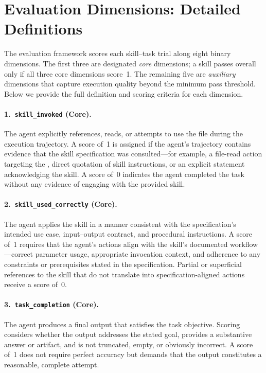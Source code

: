 
\section{Evaluation Dimensions: Detailed Definitions}
\label{app:eval_dimensions}

The \medskillbench evaluation framework scores each skill--task trial along eight binary dimensions.
The first three are designated \emph{core} dimensions; a skill passes overall only if all three core dimensions score~1.
The remaining five are \emph{auxiliary} dimensions that capture execution quality beyond the minimum pass threshold.
Below we provide the full definition and scoring criteria for each dimension.

\paragraph{1.\ \texttt{skill\_invoked} (Core).}
The agent explicitly references, reads, or attempts to use the \skillmd file during the execution trajectory.
A score of~1 is assigned if the agent's trajectory contains evidence that the skill specification was consulted---for example, a file-read action targeting the \skillmd, direct quotation of skill instructions, or an explicit statement acknowledging the skill.
A score of~0 indicates the agent completed the task without any evidence of engaging with the provided skill.

\paragraph{2.\ \texttt{skill\_used\_correctly} (Core).}
The agent applies the skill in a manner consistent with the specification's intended use case, input--output contract, and procedural instructions.
A score of~1 requires that the agent's actions align with the skill's documented workflow---correct parameter usage, appropriate invocation context, and adherence to any constraints or prerequisites stated in the specification.
Partial or superficial references to the skill that do not translate into specification-aligned actions receive a score of~0.

\paragraph{3.\ \texttt{task\_completion} (Core).}
The agent produces a final output that satisfies the task objective.
Scoring considers whether the output addresses the stated goal, provides a substantive answer or artifact, and is not truncated, empty, or obviously incorrect.
A score of~1 does not require perfect accuracy but demands that the output constitutes a reasonable, complete attempt.

